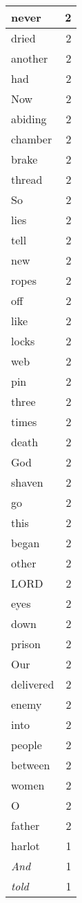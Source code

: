 \begin{center}
\begin{longtable}{l|r}
never & 2\\ \hline 
dried & 2\\ \hline 
another & 2\\ \hline 
had & 2\\ \hline 
Now & 2\\ \hline 
abiding & 2\\ \hline 
chamber & 2\\ \hline 
brake & 2\\ \hline 
thread & 2\\ \hline 
So & 2\\ \hline 
lies & 2\\ \hline 
tell & 2\\ \hline 
new & 2\\ \hline 
ropes & 2\\ \hline 
off & 2\\ \hline 
like & 2\\ \hline 
locks & 2\\ \hline 
web & 2\\ \hline 
pin & 2\\ \hline 
three & 2\\ \hline 
times & 2\\ \hline 
death & 2\\ \hline 
God & 2\\ \hline 
shaven & 2\\ \hline 
go & 2\\ \hline 
this & 2\\ \hline 
began & 2\\ \hline 
other & 2\\ \hline 
LORD & 2\\ \hline 
eyes & 2\\ \hline 
down & 2\\ \hline 
prison & 2\\ \hline 
Our & 2\\ \hline 
delivered & 2\\ \hline 
enemy & 2\\ \hline 
into & 2\\ \hline 
people & 2\\ \hline 
between & 2\\ \hline 
women & 2\\ \hline 
O & 2\\ \hline 
father & 2\\ \hline 
harlot & 1\\ \hline 
\emph{And} & 1\\ \hline 
\emph{told} & 1\\ \hline 

\end{longtable}
\end{center}
